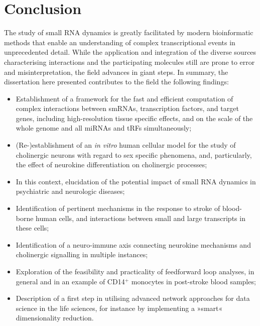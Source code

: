 %

\chapter{Conclusion}
\label{conclusion}
The study of small RNA dynamics is greatly facilitated by modern bioinformatic methods that enable an understanding of complex transcriptional events in unprecedented detail. While the application and integration of the diverse sources characterising interactions and the participating molecules still are prone to error and misinterpretation, the field advances in giant steps. In summary, the dissertation here presented contributes to the field the following findings:

\begin{itemize}[noitemsep, leftmargin=.5cm, label={\tiny\raisebox{.5ex}{\textbullet}}]
\item Establishment of a framework for the fast and efficient computation of complex interactions between smRNAs, transcription factors, and target genes, including high-resolution tissue specific effects, and on the scale of the whole genome and all miRNAs and tRFs simultaneously;

\item (Re-)establishment of an \emph{in vitro} human cellular model for the study of cholinergic neurons with regard to sex specific phenomena, and, particularly, the effect of neurokine differentiation on cholinergic processes;

\item In this context, elucidation of the potential impact of small RNA dynamics in psychiatric and neurologic diseases;

\item Identification of pertinent mechanisms in the response to stroke of blood-borne human cells, and interactions between small and large transcripts in these cells;

\item Identification of a neuro-immune axis connecting neurokine mechanisms and cholinergic signalling in multiple instances;

\item Exploration of the feasibility and practicality of feedforward loop analyses, in general and in an example of CD14$^+$ monocytes in post-stroke blood samples;

\item Description of a first step in utilising advanced network approaches for data science in the life sciences, for instance by implementing a »smart« dimensionality reduction.
\end{itemize}

